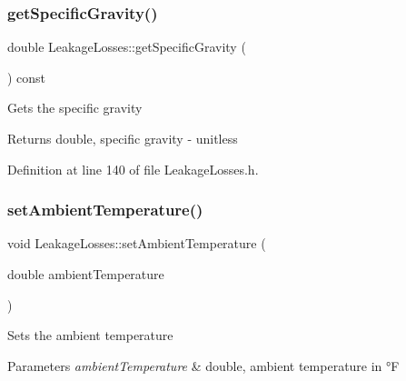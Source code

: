 \mbox{\label{class_leakage_losses_a37cd8c2282547246bab395424dad51d9}} 
\subsubsection{\texorpdfstring{get\+Specific\+Gravity()}{getSpecificGravity()}\hspace{0.1cm}{\footnotesize\ttfamily [3/3]}}
{\footnotesize\ttfamily double Leakage\+Losses\+::get\+Specific\+Gravity (\begin{DoxyParamCaption}{ }\end{DoxyParamCaption}) const\hspace{0.3cm}{\ttfamily [inline]}}

Gets the specific gravity \begin{DoxyReturn}{Returns}
double, specific gravity -\/ unitless 
\end{DoxyReturn}


Definition at line 140 of file Leakage\+Losses.\+h.

\mbox{\label{class_leakage_losses_aa6028111b3eb305d9ea6f9efea7c6c66}} 
\subsubsection{\texorpdfstring{set\+Ambient\+Temperature()}{setAmbientTemperature()}\hspace{0.1cm}{\footnotesize\ttfamily [1/3]}}
{\footnotesize\ttfamily void Leakage\+Losses\+::set\+Ambient\+Temperature (\begin{DoxyParamCaption}\item[{double}]{ambient\+Temperature }\end{DoxyParamCaption})\hspace{0.3cm}{\ttfamily [inline]}}

Sets the ambient temperature 
\begin{DoxyParams}{Parameters}
{\em ambient\+Temperature} & double, ambient temperature in °F \\
\hline
\end{DoxyParams}


